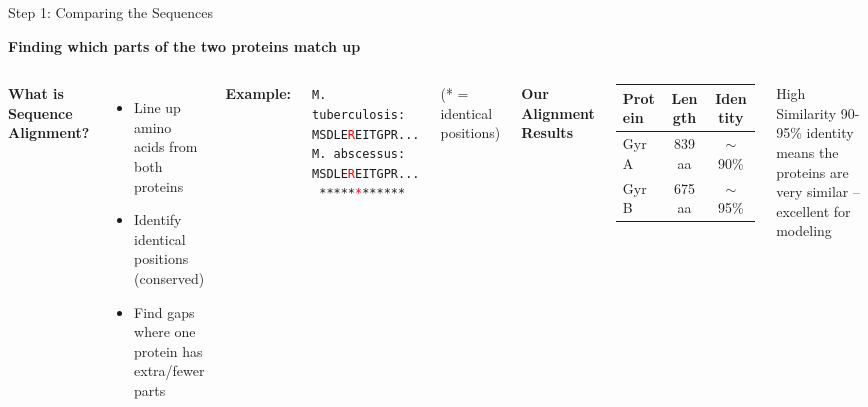 \documentclass[aspectratio=169,xcolor=table]{beamer}
\begin{document}
\begin{frame}{Step 1: Comparing the Sequences}

\textbf{Finding which parts of the two proteins match up}

\vspace{0.3cm}

\begin{columns}
\textbf{What is Sequence Alignment?}
\begin{itemize}
    \item Line up amino acids from both proteins
    \item Identify identical positions (conserved)
    \item Find gaps where one protein has extra/fewer parts
\end{itemize}

\vspace{0.2cm}

\textbf{Example:}
\begin{center}
\footnotesize
\texttt{M. tuberculosis: MSDLE\textcolor{red}{R}EITGPR...}\\
\texttt{M. abscessus:    MSDLE\textcolor{red}{R}EITGPR...}\\
\texttt{                 *****\textcolor{red}{*}******}
\end{center}
\footnotesize (* = identical positions)
\normalsize

\textbf{Our Alignment Results}
\begin{table}
\centering
\footnotesize
\begin{tabular}{lcc}
\toprule
\textbf{Protein} & \textbf{Length} & \textbf{Identity} \\
\midrule
GyrA & 839 aa & $\sim$90\% \\
GyrB & 675 aa & $\sim$95\% \\
\bottomrule
\end{tabular}
\end{table}

\vspace{0.3cm}

\begin{alertblock}{High Similarity}
90-95\% identity means the proteins are very similar -- excellent for modeling
\end{alertblock}
\end{columns}

\end{frame}
\end{document}
